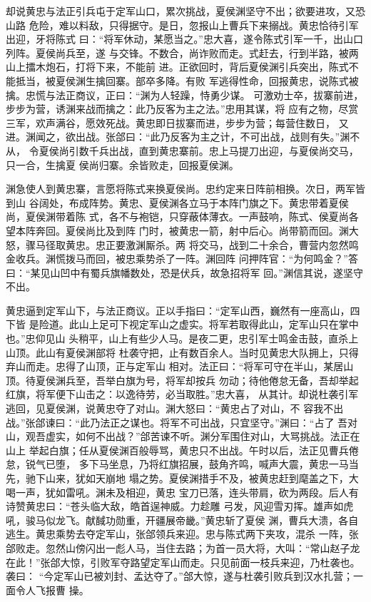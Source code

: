 却说黄忠与法正引兵屯于定军山口，累次挑战，夏侯渊坚守不出；欲要进攻，又恐山路
危险，难以料敌，只得据守。是日，忽报山上曹兵下来搦战。黄忠恰待引军出迎，牙将陈式
曰：“将军休动，某愿当之。”忠大喜，遂令陈式引军一千，出山口列阵。夏侯尚兵至，遂
与交锋。不数合，尚诈败而走。式赶去，行到半路，被两山上擂木炮石，打将下来，不能前
进。正欲回时，背后夏侯渊引兵突出，陈式不能抵当，被夏侯渊生擒回寨。部卒多降。有败
军逃得性命，回报黄忠，说陈式被擒。忠慌与法正商议，正曰：“渊为人轻躁，恃勇少谋。
可激劝士卒，拔寨前进，步步为营，诱渊来战而擒之：此乃反客为主之法。”忠用其谋，将
应有之物，尽赏三军，欢声满谷，愿效死战。黄忠即日拔寨而进，步步为营；每营住数日，
又进。渊闻之，欲出战。张郃曰：“此乃反客为主之计，不可出战，战则有失。”渊不从，
令夏侯尚引数千兵出战，直到黄忠寨前。忠上马提刀出迎，与夏侯尚交马，只一合，生擒夏
侯尚归寨。余皆败走，回报夏侯渊。

渊急使人到黄忠寨，言愿将陈式来换夏侯尚。忠约定来日阵前相换。次日，两军皆到山
谷阔处，布成阵势。黄忠、夏侯渊各立马于本阵门旗之下。黄忠带着夏侯尚，夏侯渊带着陈
式，各不与袍铠，只穿蔽体薄衣。一声鼓响，陈式、侯夏尚各望本阵奔回。夏侯尚比及到阵
门时，被黄忠一箭，射中后心。尚带箭而回。渊大怒，骤马径取黄忠。忠正要激渊厮杀。两
将交马，战到二十余合，曹营内忽然鸣金收兵。渊慌拨马而回，被忠乘势杀了一阵。渊回阵
问押阵官：“为何鸣金？”答曰：“某见山凹中有蜀兵旗幡数处，恐是伏兵，故急招将军
回。”渊信其说，遂坚守不出。

黄忠逼到定军山下，与法正商议。正以手指曰：“定军山西，巍然有一座高山，四下皆
是险道。此山上足可下视定军山之虚实。将军若取得此山，定军山只在掌中也。”忠仰见山
头稍平，山上有些少人马。是夜二更，忠引军士鸣金击鼓，直杀上山顶。此山有夏侯渊部将
杜袭守把，止有数百余人。当时见黄忠大队拥上，只得弃山而走。忠得了山顶，正与定军山
相对。法正曰：“将军可守在半山，某居山顶。待夏侯渊兵至，吾举白旗为号，将军却按兵
勿动；待他倦怠无备，吾却举起红旗，将军便下山击之：以逸待劳，必当取胜。”忠大喜，
从其计。却说杜袭引军逃回，见夏侯渊，说黄忠夺了对山。渊大怒曰：“黄忠占了对山，不
容我不出战。”张郃谏曰：“此乃法正之谋也。将军不可出战，只宜坚守。”渊曰：“占了
吾对山，观吾虚实，如何不出战？”郃苦谏不听。渊分军围住对山，大骂挑战。法正在山上
举起白旗；任从夏侯渊百般辱骂，黄忠只不出战。午时以后，法正见曹兵倦怠，锐气已堕，
多下马坐息，乃将红旗招展，鼓角齐鸣，喊声大震，黄忠一马当先，驰下山来，犹如天崩地
塌之势。夏侯渊措手不及，被黄忠赶到麾盖之下，大喝一声，犹如雷吼。渊未及相迎，黄忠
宝刀已落，连头带肩，砍为两段。后人有诗赞黄忠曰：“苍头临大敌，皓首逞神威。力趁雕
弓发，风迎雪刃挥。雄声如虎吼，骏马似龙飞。献馘功勋重，开疆展帝畿。”黄忠斩了夏侯
渊，曹兵大溃，各自逃生。黄忠乘势去夺定军山，张郃领兵来迎。忠与陈式两下夹攻，混杀
一阵，张郃败走。忽然山傍闪出一彪人马，当住去路；为首一员大将，大叫：“常山赵子龙
在此！”张郃大惊，引败军夺路望定军山而走。只见前面一枝兵来迎，乃杜袭也。袭曰：
“今定军山已被刘封、孟达夺了。”郃大惊，遂与杜袭引败兵到汉水扎营；一面令人飞报曹
操。

